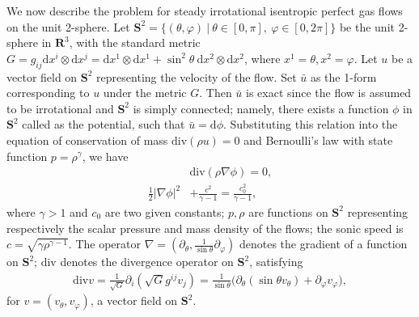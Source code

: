\documentclass[10pt,a4paper]{amsart}
\newcommand{\dd}{\mathrm{d}}
\newcommand{\di}{\mathrm{div}}
\numberwithin{equation}{section}
\begin{document}
We now describe the problem for steady irrotational isentropic perfect gas flows on the unit 2-sphere. Let $\mathbf{S}^2=\{(\theta, \varphi)~|~\theta\in[0,\pi],~\varphi \in [0,2\pi]\}$ be the  unit 2-sphere in $\mathbf{R}^3$, with the standard metric $G=g_{ij}\dd x^i\otimes\dd x^j=\dd x^1\otimes\dd x^1+\sin^2\theta~\dd x^2\otimes\dd x^2$,  where $x^1=\theta, x^2=\varphi$. Let $u$ be a vector field on $\mathbf{S}^2$ representing the velocity of the flow. Set $\bar{u}$ as the 1-form corresponding to $u$ under the metric $G$. Then  $\bar{u}$ is exact since the flow is assumed to be irrotational and $\mathbf{S}^2$ is simply connected; namely, there exists a function $\phi$ in $\mathbf{S}^2$ called as the potential, such that $ \bar{u}= \dd \phi$. Substituting this relation into the equation of conservation of mass $\di(\rho u) = 0$ and Bernoulli's law with state function $p= \rho^{\gamma}$, we have
	\begin{align}
		&\di(\rho \nabla \phi)=0,\label{mass conservation}\\
		\frac{1}{2}|\nabla\phi|^2&+\frac{c^2}{\gamma-1}=\frac{c^2_0}{\gamma-1},\label{potential flow bernoulli}
	\end{align}
where $\gamma> 1$ and $c_0$ are two given constants; $p,\rho$ are functions on $\mathbf{S}^2$ representing respectively the scalar pressure and mass density of the flows; the sonic speed is $c=\sqrt{\gamma \rho^{ \gamma-1}}$. The operator $\nabla=(\partial_\theta,\frac{1}{\sin\theta}\partial_\varphi) $ denotes the gradient of a function on $\mathbf{S}^2$; $\di$ denotes the divergence operator on $\mathbf{S}^2$, satisfying
	\begin{align}\label{di in s2}
		\di v=\frac{1}{\sqrt{G}}\partial_i(\sqrt{G}g^{ij}v_j)=\frac{1}{\sin\theta}\big(\partial_\theta(\sin\theta v_\theta)+\partial_\varphi v_\varphi\big), 
	\end{align}
for $v=(v_\theta, v_\varphi)$, a vector field on $\mathbf{S}^2$.
	 
\end{document}
